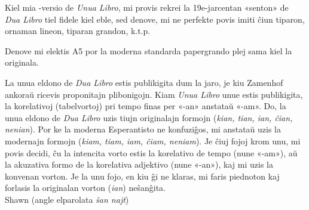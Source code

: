 %
%
\kolofono

\small Kiel mia \XeLaTeX{}-versio de \emph{Unua Libro}, mi provis rekrei la 19e-jarcentan «senton» de \emph{Dua Libro} tiel fidele kiel eble, sed denove, mi ne perfekte povis imiti ĉiun tiparon, ornaman lineon, tiparan grandon, k.t.p.

Denove mi elektis A5 por la moderna standarda papergrando plej sama kiel la originala.

La unua eldono de \emph{Dua Libro} estis publikigita dum la jaro, je kiu Zamenhof ankoraŭ ricevis proponitajn plibonigojn.  Kiam \emph{Unua Libro} unue estis publikigita, la korelativoj (tabelvortoj) pri tempo finas per «-an» anstataŭ «-am».  Do, la unua eldono de \emph{Dua Libro} uzis tiujn originalajn formojn (\emph{kian, tian, ian, ĉian, nenian}).  Por ke la moderna Esperantisto ne konfuziĝos, mi anstataŭ uzis la modernajn formojn (\emph{kiam, tiam, iam, ĉiam, neniam}).  Je ĉiuj fojoj krom unu, mi povis decidi, ĉu la intencita vorto estis la korelativo de tempo (nune «-am»), aŭ la akuzativa formo de la korelativa adjektivo (nune «-an»), kaj mi uzis la konvenan vorton.  Je la unu fojo, en kiu ĝi ne klaras, mi faris piednoton kaj forlasis la originalan vorton (\emph{ian}) neŝanĝita.\\[1ex] 

{\setlength{\parindent}{0em}
Shawn  (angle elparolata \emph{ŝan najt})\\
\hodiau}
